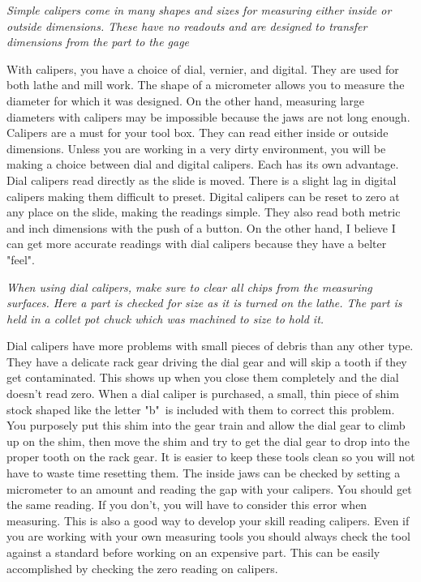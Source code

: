 \bigskip
\textit{Simple calipers come in many shapes and sizes for measuring either
inside or outside dimensions. These have no readouts and are designed to
transfer dimensions from the part to the gage}
\bigskip


With calipers, you have a choice of dial, vernier, and digital. They are used
for both lathe and mill work. The shape of a micrometer allows you to measure
the diameter for which it was designed. On the other hand, measuring large
diameters with calipers may be impossible because the jaws are not long enough.
Calipers are a must for your tool box. They can read either inside or outside
dimensions. Unless you are working in a very dirty environment, you will be
making a choice between dial and digital calipers. Each has its own advantage.
Dial calipers read directly as the slide is moved. There is a slight lag in
digital calipers making them difficult to preset. Digital calipers can be reset
to zero at any place on the slide, making the readings simple. They also read
both metric and inch dimensions with the push of a button. On the other hand, I
believe I can get more accurate readings with dial calipers because they have a
belter "feel".


\bigskip
\textit{When using dial calipers, make sure to clear all chips from the
measuring surfaces. Here a part is checked for size as it is turned on the
lathe. The part is held in a collet pot chuck which was machined to size to hold
it.}
\bigskip

Dial calipers have more problems with small pieces of debris than any other
type. They have a delicate rack gear driving the dial gear and will skip a tooth
if they get contaminated. This shows up when you close them completely and the
dial doesn't read zero. When a dial caliper is purchased, a small, thin piece of
shim stock shaped like the letter "b"\ is included with them to correct this
problem. You purposely put this shim into the gear train and allow the dial gear
to climb up on the shim, then move the shim and try to get the dial gear to drop
into the proper tooth on the rack gear. It is easier to keep these tools clean
so you will not have to waste time resetting them. The inside jaws can be
checked by setting a micrometer to an amount and reading the gap with your
calipers. You should get the same reading. If you don't, you will have to
consider this error when measuring. This is also a good way to develop your
skill reading calipers. Even if you are working with your own measuring tools
you should always check the tool against a standard before working on an
expensive part. This can be easily accomplished by checking the zero reading on
calipers.

